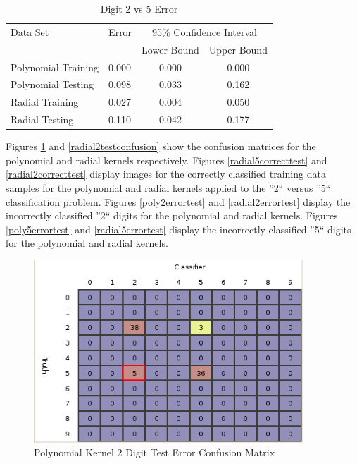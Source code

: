 \documentclass{article}
\begin{document}
\begin{table}
\caption{Digit 2 vs 5 Error}
\begin{center}
\begin{tabular}{llcc}
\toprule
Data Set & Error & \multicolumn{2}{c}{95\% Confidence Interval} \\
\cmidrule(r){3-4}
& & Lower Bound & Upper Bound \\
\midrule
Polynomial Training & 0.000 & 0.000 & 0.000 \\
Polynomial Testing & 0.098 & 0.033 & 0.162 \\
Radial Training & 0.027 & 0.004 & 0.050 \\
Radial Testing & 0.110 & 0.042 & 0.177 \\
\bottomrule
\end{tabular}
\label{error1}
\end{center}
\end{table}

Figures \ref{poly2testconfusion} and \ref{radial2testconfusion} show the confusion matrices for the polynomial and radial kernels respectively. Figures \ref{radial5correcttest} and \ref{radial2correcttest} display images for the correctly classified training data samples for the polynomial and radial kernels applied to the ''2`` versus ''5`` classification problem. Figures \ref{poly2errortest} and \ref{radial2errortest} display the incorrectly classified ''2`` digits for the polynomial and radial kernels. Figures \ref{poly5errortest} and \ref{radial5errortest} display the incorrectly classified ''5`` digits for the polynomial and radial kernels.

\begin{figure}
\centering
\includegraphics[width=0.9\textwidth]{images/test2_5_confusion_a0156.png}
\caption{Polynomial Kernel 2 Digit Test Error Confusion Matrix}
\label{poly2testconfusion}
\end{figure}
\end{document}
